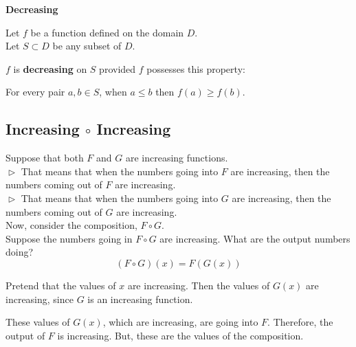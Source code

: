 \documentclass{ximera}
\begin{document}
\begin{summary} \textbf{\textcolor{green!50!black}{Decreasing}} 


Let $f$ be a function defined on the domain $D$. \\
Let $S \subset D$ be any subset of $D$.

$f$ is \textbf{decreasing} on $S$ provided $f$ possesses this property:  


\begin{center}
For every pair $a, b \in S$, when $a \leq b$ then $f(a) \geq f(b)$.
\end{center}

\end{summary}











\subsection*{Increasing $\circ$ Increasing}


Suppose that both $F$ and $G$ are increasing functions. \\

$\vartriangleright$ That means that when the numbers going into $F$ are increasing, then the numbers coming out of $F$ are increasing. \\

$\vartriangleright$ That means that when the numbers going into $G$ are increasing, then the numbers coming out of $G$ are increasing. \\



Now, consider the composition, $F \circ G$. \\


Suppose the numbers going in $F \circ G$ are increasing.  What are the output numbers doing? \\




\[ (F \circ G)(x) = F(G(x)) \]


Pretend that the values of $x$ are increasing. Then the values of $G(x)$ are increasing, since $G$ is an increasing function.

These values of $G(x)$, which are increasing, are going into $F$.  Therefore, the output of $F$ is increasing.  But, these are the values of the composition.
\end{document}
